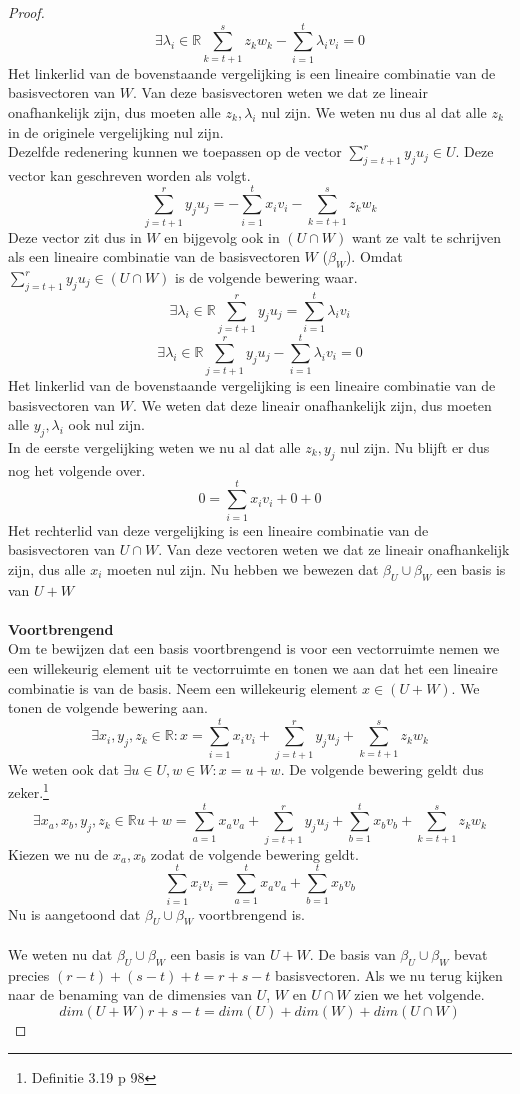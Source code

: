 \documentclass[lineaire_algebra_oplossingen.tex]{subfiles}
\begin{document}
\begin{proof}
\[\]
\[
\exists \lambda_i \in \mathbb{R} \sum_{k=t+1}^sz_kw_k - \sum_{i=1}^t\lambda_iv_i = 0 
\]
Het linkerlid van de bovenstaande vergelijking is een lineaire combinatie van de basisvectoren van $W$. Van deze basisvectoren weten we dat ze lineair onafhankelijk zijn, dus moeten alle $z_k, \lambda_i$ nul zijn. We weten nu dus al dat alle $z_k$ in de originele vergelijking nul zijn.\\
Dezelfde redenering kunnen we toepassen op de vector $\sum_{j=t+1}^ry_ju_j \in U$. Deze vector kan geschreven worden als volgt.
\[
\sum_{j=t+1}^ry_ju_j= -\sum_{i=1}^tx_iv_i - \sum_{k=t+1}^sz_kw_k
\]
Deze vector zit dus in $W$ en bijgevolg ook in $(U\cap W)$ want ze valt te schrijven als een lineaire combinatie van de basisvectoren $W$ ($\beta_W$). Omdat $\sum_{j=t+1}^ry_ju_j \in (U\cap W)$ is de volgende bewering waar.
\[
\exists \lambda_i \in \mathbb{R} \sum_{j=t+1}^ry_ju_j = \sum_{i=1}^t\lambda_iv_i
\]
\[
\exists \lambda_i \in \mathbb{R} \sum_{j=t+1}^ry_ju_j - \sum_{i=1}^t\lambda_iv_i = 0 
\]
Het linkerlid van de bovenstaande vergelijking is een lineaire combinatie van de basisvectoren van $W$. We weten dat deze lineair onafhankelijk zijn, dus moeten alle $y_j,  \lambda_i$ ook nul zijn.\\
In de eerste vergelijking weten we nu al dat alle $z_k,y_j$ nul zijn. Nu blijft er dus nog het volgende over.
\[
0 = \sum_{i=1}^tx_iv_i + 0 + 0
\]
Het rechterlid van deze vergelijking is een lineaire combinatie van de basisvectoren van $U\cap W$. Van deze vectoren weten we dat ze lineair onafhankelijk zijn, dus alle $x_i$ moeten nul zijn.
Nu hebben we bewezen dat $\beta_U\cup \beta_W$ een basis is van $U+W$\\\\
\textbf{Voortbrengend}\\
Om te bewijzen dat een basis voortbrengend is voor een vectorruimte nemen we een willekeurig element uit te vectorruimte en tonen we aan dat het een lineaire combinatie is van de basis.
Neem een willekeurig element $x \in (U + W)$. We tonen de volgende bewering aan.
\[
\exists x_i,y_j,z_k \in \mathbb{R}: x = \sum_{i=1}^tx_iv_i + \sum_{j=t+1}^ry_ju_j + \sum_{k=t+1}^sz_kw_k
\]
We weten ook dat $\exists u\in U, w\in W: x = u+w$. De volgende bewering geldt dus zeker.\footnote{Definitie 3.19 p 98}
\[
\exists x_a,x_b,y_j,z_k \in \mathbb{R}  u+w = \sum_{a=1}^tx_av_a + \sum_{j=t+1}^ry_ju_j + \sum_{b=1}^tx_bv_b + \sum_{k=t+1}^sz_kw_k
\]
Kiezen we nu de $x_a,x_b$ zodat de volgende bewering geldt.
\[
\sum_{i=1}^tx_iv_i = \sum_{a=1}^tx_av_a + \sum_{b=1}^tx_bv_b 
\]
Nu is aangetoond dat $\beta_U \cup \beta_W$ voortbrengend is.
\\\\ 
We weten nu dat $\beta_U \cup \beta_W$ een basis is van $U+W$. De basis van $\beta_U \cup \beta_W$ bevat precies $(r-t)+(s-t)+t = r+s-t$ basisvectoren. Als we nu terug kijken naar de benaming van de dimensies van $U$, $W$ en $U\cap W$ zien we het volgende.
\[
dim(U+W) r+s-t = dim(U) + dim(W) + dim(U \cap W)
\]
\end{proof}
\end{document}
